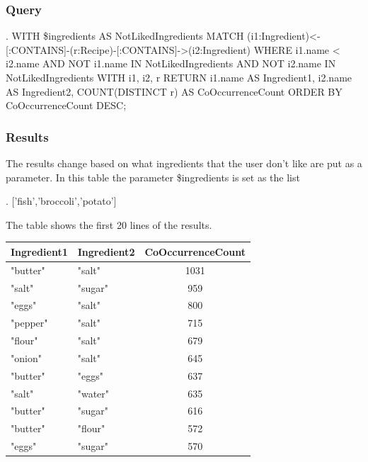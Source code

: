 \begin{enumerate}
    \subsubsection{Query}
\begin{CypherQuery}
.
WITH \$ingredients AS NotLikedIngredients
MATCH
(i1:Ingredient)<-[:CONTAINS]-(r:Recipe)-[:CONTAINS]->(i2:Ingredient)
WHERE i1.name < i2.name 
AND NOT i1.name  IN NotLikedIngredients 
AND NOT i2.name IN NotLikedIngredients
WITH i1, i2, r
RETURN i1.name AS Ingredient1,
i2.name AS Ingredient2,
COUNT(DISTINCT r) AS CoOccurrenceCount
ORDER BY CoOccurrenceCount DESC;
\end{CypherQuery}
    \subsubsection{Results}
    The results change based on what ingredients that the user don't like are put as a parameter. In this table the parameter  \$ingredients is set as the list 
\begin{CypherQuery}
.
['fish','broccoli','potato']
\end{CypherQuery}
    The table shows the first 20 lines of the results.
    \begin{table}[h!]
\small %
\centering
\begin{tabularx}{\textwidth}{>{\raggedright\arraybackslash}X>{\raggedright\arraybackslash}Xc}
\toprule
\textbf{Ingredient1} & \textbf{Ingredient2} & \textbf{CoOccurrenceCount} \\
\midrule
"butter"            & "salt"              & 1031 \\
"salt"              & "sugar"             & 959  \\
"eggs"              & "salt"              & 800  \\
"pepper"            & "salt"              & 715  \\
"flour"             & "salt"              & 679  \\
"onion"             & "salt"              & 645  \\
"butter"            & "eggs"              & 637  \\
"salt"              & "water"             & 635  \\
"butter"            & "sugar"             & 616  \\
"butter"            & "flour"             & 572  \\
"eggs"              & "sugar"             & 570  \\

\end{tabularx}
\end{table}
\end{enumerate}
